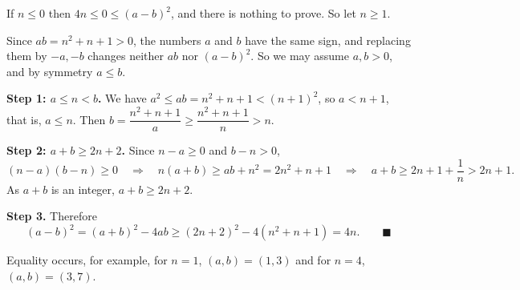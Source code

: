 If $n\le0$ then $4n\le0\le(a-b)^2$, and there is nothing to prove. So let $n\ge1$.

Since $ab=n^2+n+1>0$, the numbers $a$ and $b$ have the same sign, and replacing them by $-a,-b$ changes neither $ab$ nor $(a-b)^2$. So we may assume $a,b>0$, and by symmetry $a\le b$.

\textbf{Step 1: $a\le n<b$.} We have $a^2\le ab=n^2+n+1<(n+1)^2$, so $a<n+1$, that is, $a\le n$. Then $b=\dfrac{n^2+n+1}{a}\ge\dfrac{n^2+n+1}{n}>n$.

\textbf{Step 2: $a+b\ge2n+2$.} Since $n-a\ge0$ and $b-n>0$,
\[(n-a)(b-n)\ge0\quad\Longrightarrow\quad n(a+b)\ge ab+n^2=2n^2+n+1\quad\Longrightarrow\quad a+b\ge2n+1+\dfrac{1}{n}>2n+1 .\]
As $a+b$ is an integer, $a+b\ge2n+2$.

\textbf{Step 3.} Therefore
\[(a-b)^2=(a+b)^2-4ab\ge(2n+2)^2-4\left(n^2+n+1\right)=4n .\qquad\blacksquare\]

Equality occurs, for example, for $n=1$, $(a,b)=(1,3)$ and for $n=4$, $(a,b)=(3,7)$.

